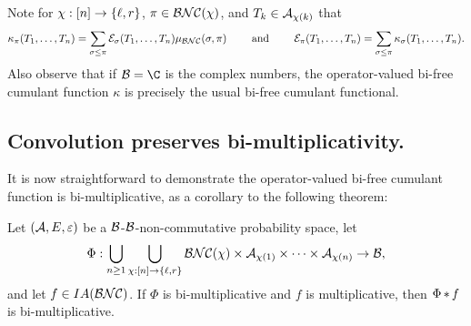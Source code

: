 		Note for $\chi : [n] \to \left\{\ell, r\right\}$, $\pi \in \mathcal{BNC}(\chi)$, and $T_k \in \mathcal{A}_{\chi(k)}$ that
		\[
			\kappa_\pi(T_1,\ldots, T_n) = \sum_{\sigma \leq \pi} \mathcal{E}_\sigma(T_1, \ldots, T_n) \mu_{\mathcal{BNC}}(\sigma, \pi)
			\qquad \text{ and }\qquad
			\mathcal{E}_\pi(T_1, \ldots, T_n) = \sum_{\sigma \leq \pi} \kappa_\sigma(T_1, \ldots, T_n).
		\]
		Also observe that if $\cB = \C$ is the complex numbers, the operator-valued bi-free cumulant function $\kappa$ is precisely the usual bi-free cumulant functional.





		\subsection{Convolution preserves bi-multiplicativity.}
		It is now straightforward to demonstrate the operator-valued bi-free cumulant function is bi-multiplicative, as a corollary to the following theorem:

		\begin{theorem}
			\label{thmbimulticonvoledwithmultiisbimult}
			Let $(\mathcal{A}, E, \varepsilon)$ be a $\mathcal{B}$-$\mathcal{B}$-non-commutative probability space, let
			\[
				\Phi : \bigcup_{n\geq 1} \bigcup_{\chi : [n] \to \left\{\ell, r\right\}} \mathcal{BNC}(\chi) \times \mathcal{A}_{\chi(1)} \times \cdots \times \mathcal{A}_{\chi(n)} \to \mathcal{B}, 
			\]
			and let $f \in IA(\mathcal{BNC})$.
			If $\Phi$ is bi-multiplicative and $f$ is multiplicative, then $\Phi \mathop{\ast} f$ is bi-multiplicative.
		\end{theorem}

